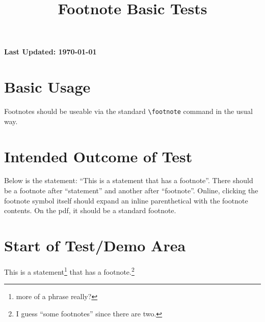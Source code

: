 \documentclass{ximera}
\title{Footnote Basic Tests}
\begin{document}
\begin{abstract}
    
\end{abstract}
\maketitle

{{\Huge \bfseries Last Updated: \today}} \\


\section{Basic Usage}
Footnotes should be useable via the standard \verb|\footnote| command in the usual way.

\section{Intended Outcome of Test}
Below is the statement: ``This is a statement that has a footnote''. There should be a footnote after ``statement'' and another after ``footnote''.
Online, clicking the footnote symbol itself should expand an inline parenthetical with the footnote contents. On the pdf, it should be 
a standard footnote.

\section{Start of Test/Demo Area}
This is a statement\footnote{more of a phrase really?} that has a footnote.\footnote{I guess ``some footnotes'' since there are two.}

\hrulefill
\end{document}

